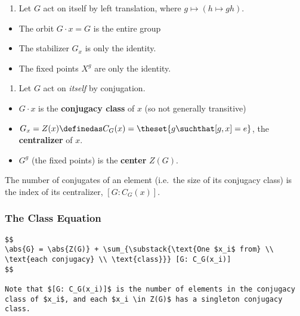 \begin{enumerate}
\def\labelenumi{\arabic{enumi}.}
\tightlist
\item
  Let \(G\) act on itself by left translation, where
  \(g \mapsto (h\mapsto gh)\).
\end{enumerate}

\begin{itemize}
\tightlist
\item
  The orbit \(G\cdot x = G\) is the entire group
\item
  The stabilizer \(G_x\) is only the identity.
\item
  The fixed points \(X^g\) are only the identity.
\end{itemize}

\begin{enumerate}
\def\labelenumi{\arabic{enumi}.}
\tightlist
\item
  Let \(G\) act on \emph{itself} by conjugation.
\end{enumerate}

\begin{itemize}
\item
  \(G \cdot x\) is the \textbf{conjugacy class} of \(x\) (so not
  generally transitive)
\item
  \(G_x = Z(x) \definedas C_G(x) = \theset{g \suchthat [g, x] = e}\),
  the \textbf{centralizer} of \(x\).
\item
  \(G^g\) (the fixed points) is the \textbf{center} \(Z(G)\).
\end{itemize}

\begin{corollary}

The number of conjugates of an element (i.e.~the size of its conjugacy
class) is the index of its centralizer, \([G: C_G(x)]\).

\end{corollary}

\hypertarget{the-class-equation}{%
\subsubsection{The Class Equation}\label{the-class-equation}}

\begin{verbatim}
$$
\abs{G} = \abs{Z(G)} + \sum_{\substack{\text{One $x_i$ from} \\ \text{each conjugacy} \\ \text{class}}} [G: C_G(x_i)]
$$

Note that $[G: C_G(x_i)]$ is the number of elements in the conjugacy class of $x_i$, and each $x_i \in Z(G)$ has a singleton conjugacy class.
\end{verbatim}

